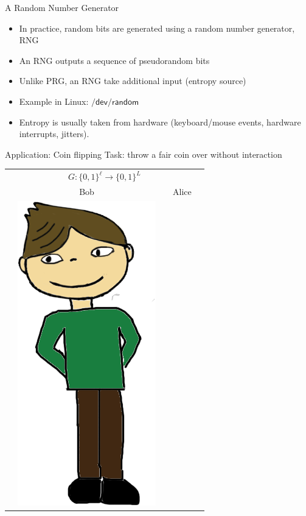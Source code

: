 \documentclass[usenames,dvipsnames, 9pt,aspectratio=169]{beamer}
\begin{document}
\begin{frame}{A Random Number Generator}
	\Large
	\begin{itemize}
		\itemsep7pt
		\item In practice, random bits are generated using a random number generator,  RNG
		\item An RNG outputs a sequence of pseudorandom bits
		\item Unlike PRG, an RNG take additional input (entropy source)
		\item Example in Linux: $\mathsf{/dev/random}$
		\item Entropy is usually taken from hardware (keyboard/mouse events, hardware interrupts, jitters).
	\end{itemize}
\end{frame}

\begin{frame}{Application: Coin flipping}
\LARGE
Task:  throw a fair coin over without interaction 
\begin{center}
	\begin{tabular}{c c c c c}
		 \multicolumn{5}{c}{$G: \{0,1\}^{\ell} \rightarrow \{0,1\}^{L}$}\\[10pt]
		& Bob  & & Alice &  \\
		 & \multirow{5}{*}{\includegraphics[scale=0.20]{Bob}} & &

\end{tabular}
\end{center}
\end{frame}
\end{document}
